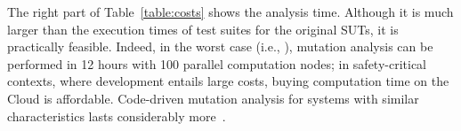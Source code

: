 The right part of Table~\ref{table:costs} shows the \APPR analysis time. Although it is much larger than the execution times of test suites for the original SUTs, it is practically feasible. Indeed, in the worst case (i.e., \ADCS), mutation analysis can be performed in 12 hours with 100 parallel computation nodes; in safety-critical contexts, where development entails large costs, buying computation time on the Cloud is affordable. {Code-driven mutation analysis for systems with similar characteristics lasts considerably more~\cite{Ramler2017,Oscar:MASS:TSE}.}









